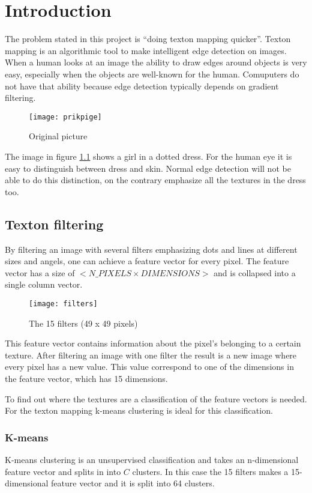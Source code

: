 \chapter{Introduction}
The problem stated in this project is ``doing texton mapping quicker''.
Texton mapping is an algorithmic tool to make intelligent edge detection on images. 
When a human looks at an image the ability to draw edges around objects is very easy, 
especially when the objects are well-known for the human. 
Comuputers do not have that ability because edge detection typically depends on gradient filtering.

\begin{figure}[H]
\centering
\texttt{[image: prikpige]}
\caption{Original picture}
\label{fig:prikpige}
\end{figure}

The image in figure \ref{fig:prikpige} shows a girl in a dotted dress. 
For the human eye it is easy to distinguish between dress and skin. 
Normal edge detection will not be able to do this distinction, 
on the contrary emphasize all the textures in the dress too.

\section{Texton filtering}
By filtering an image with several filters emphasizing dots and lines at different sizes and angels, 
one can achieve a feature vector for every pixel. 
The feature vector has a size of $<N\_PIXELS\times DIMENSIONS>$ and is collapsed into a single column vector. 

\begin{figure}[H]
\centering
\texttt{[image: filters]}
\caption{The 15 filters (49 x 49 pixels)}
\label{fig:filtre}
\end{figure}


This feature vector contains information about the pixel's belonging to a certain texture. 
After filtering an image with one filter the result is a new image where every pixel has a new value. 
This value correspond to one of the dimensions in the feature vector, which has 15 dimensions.

To find out where the textures are a classification of the feature vectors is needed. 
For the texton mapping k-means clustering is ideal for this classification.


\subsection{K-means}
K-means clustering is an unsupervised classification and takes an n-dimensional feature vector and splits in into $C$ clusters. 
In this case the 15 filters makes a 15-dimensional feature vector and it is split into 64 clusters. 

